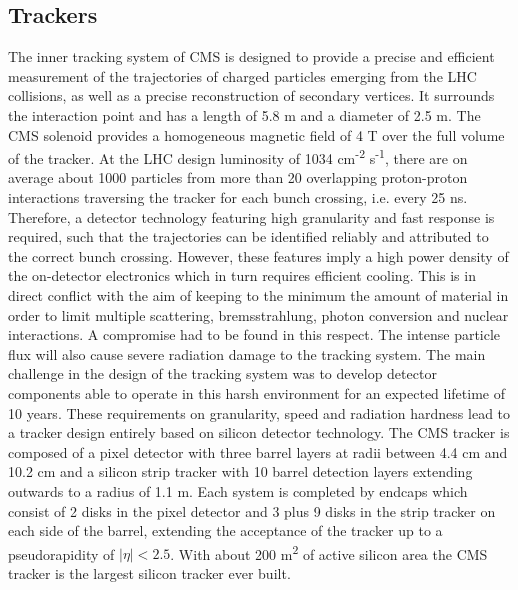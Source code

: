 \subsection{Trackers}

The inner tracking system of CMS is designed to provide a precise and efficient measurement
of the trajectories of charged particles emerging from the LHC collisions, as well as a precise
reconstruction of secondary vertices. It surrounds the interaction point and has a length of 5.8 m
and a diameter of 2.5 m. The CMS solenoid provides a homogeneous magnetic field of 4 T over
the full volume of the tracker.
At the LHC design luminosity of 1034 cm\textsuperscript{-2} s\textsuperscript{-1},
there are on average about 1000 particles from more than 20 overlapping proton-proton interactions traversing
the tracker for each bunch crossing, i.e. every 25 ns. Therefore, a detector technology featuring high
granularity and fast response is required, such that the trajectories can be identified reliably and
attributed to the correct bunch crossing. However, these features imply a high power density of
the on-detector electronics which in turn requires efficient cooling. This is in direct conflict with
the aim of keeping to the minimum the amount of material in order to limit multiple scattering,
bremsstrahlung, photon conversion and nuclear interactions. A compromise had to be found in this
respect. The intense particle flux will also cause severe radiation damage to the tracking system.
The main challenge in the design of the tracking system was to develop detector components able
to operate in this harsh environment for an expected lifetime of 10 years. These requirements on
granularity, speed and radiation hardness lead to a tracker design entirely based on silicon detector
technology. The CMS tracker is composed of a pixel detector with three barrel layers at radii
between 4.4 cm and 10.2 cm and a silicon strip tracker with 10 barrel detection layers extending
outwards to a radius of 1.1 m. Each system is completed by endcaps which consist of 2 disks in
the pixel detector and 3 plus 9 disks in the strip tracker on each side of the barrel, extending the
acceptance of the tracker up to a pseudorapidity of $|\eta| < 2.5$. With about 200 m\textsuperscript{2} of active silicon
area the CMS tracker is the largest silicon tracker ever built.


